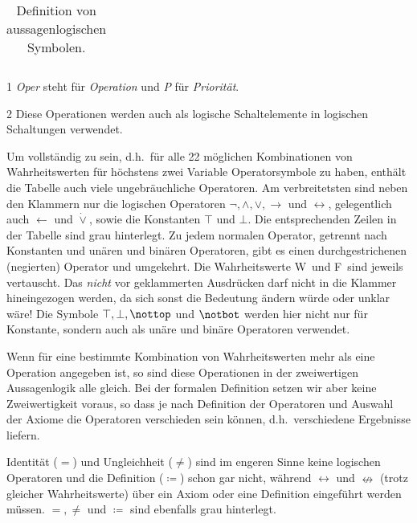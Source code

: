 \documentclass[english,ngerman,parskip=half,headsepline,footsepline]{scrreprt}
\makeatletter
\newcommand{\texttrue}{W}
\newcommand{\textfalse}{F}
\newcommand{\ltrue}{\top}      %
\newcommand{\lnfalse}{\notbot} %
\newcommand{\lfalse}{\bot}     %
\newcommand{\lntrue}{\nottop}  %
\newcommand{\lleftimp}{\operatorname{\leftarrow}}      %
\newcommand{\limp}{\operatorname{\rightarrow}}         %
\newcommand{\lequiv}{\operatorname{\leftrightarrow}}   %
\newcommand{\lnequiv}{\operatorname{\nleftrightarrow}} %
\newcommand{\lxor}{\operatorname{\dot{\lor}}}          %
\newcommand{\defeq}{\coloneqq}
\newcommand{\textdh}{d.\@ h.\@}
\makeatother
\begin{document}
\begin{table}
\begin{threeparttable}
\begin{tabularx}{\linewidth}{c||c:cc:cccc|X:X|c|}
				\hline %
			\end{tabularx}
			\caption{Definition von aussagenlogischen Symbolen.}
			\label{tab:aussagenlogische Symbole}
			\begin{tablenotes}
				\item[1] \emph{Oper} steht für \emph{Operation} und \emph{P} für \emph{Priorität}.
				\item[2] Diese Operationen werden auch als logische Schaltelemente in logischen Schaltungen verwendet.
			\end{tablenotes}
		\end{threeparttable}
	\end{table}

	Um vollständig zu sein, \textdh\ für alle 22 möglichen Kombinationen von Wahrheitswerten für höchstens zwei Variable Operatorsymbole zu haben, enthält die Tabelle auch viele ungebräuchliche Operatoren. Am verbreitetsten sind neben den Klammern nur die logischen Operatoren $\lnot, \land, \lor, \limp$ und $\lequiv$, gelegentlich auch $\lleftimp$ und $\lxor$, sowie die Konstanten $\ltrue$ und $\lfalse$. Die entsprechenden Zeilen in der Tabelle sind grau hinterlegt. Zu jedem normalen Operator, getrennt nach Konstanten und unären und binären Operatoren, gibt es einen durchgestrichenen (negierten) Operator und umgekehrt. Die Wahrheitswerte \texttrue\ und \textfalse\ sind jeweils vertauscht. Das \emph{nicht} vor geklammerten Ausdrücken darf nicht in die Klammer hineingezogen werden, da sich sonst die Bedeutung ändern würde oder unklar wäre! Die Symbole $\ltrue, \lfalse, \lntrue$ und $\lnfalse$ werden hier nicht nur für Konstante, sondern auch als unäre und binäre Operatoren verwendet.

	Wenn für eine bestimmte Kombination von Wahrheitswerten mehr als eine Operation angegeben ist, so sind diese Operationen in der zweiwertigen Aussagenlogik alle gleich. Bei der formalen Definition setzen wir aber keine Zweiwertigkeit voraus, so dass je nach Definition der Operatoren und Auswahl der Axiome die Operatoren verschieden sein können, \textdh\ verschiedene Ergebnisse liefern.

	Identität ($=$) und Ungleichheit  ($\ne$) sind im engeren Sinne keine logischen Operatoren und die Definition ($\defeq$) schon gar nicht, während $\lequiv$ und $\lnequiv$ (trotz gleicher Wahrheitswerte) über ein Axiom oder eine Definition eingeführt werden müssen. $=, \ne$ und $\defeq$ sind ebenfalls grau hinterlegt.
\end{document}
